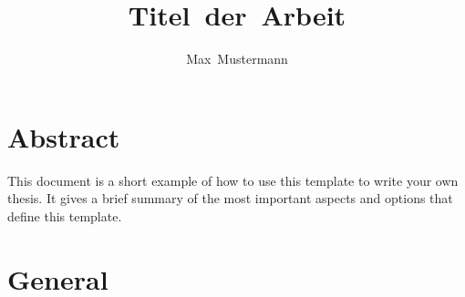 \documentclass[masterarbeit,grey, english]{mas-thesis-sections}	%
\author{Max~Mustermann}						%
\title{Titel~der~Arbeit}
\begin{document}
\maketitle				%

%
%
\makelicensepageCCBYSA

\cleardoublepage


\eidesstattlicheErklaerung

\cleardoublepage

%
\tableofcontents		%
\newpage
\listofillustrations	%


\cleardoublepage

\newpage
\begingroup %
	\let\clearpage\relax
	\printglossaries
\endgroup

\setcounter{page}{1}


% 
% 
% 
% 
% 
% 


\section*{Abstract}
{}%

This document is a short example of how to use this template to write your own thesis. It gives a brief summary of the most important aspects and options that define this template.

\newpage


\section{General}
\end{document}
